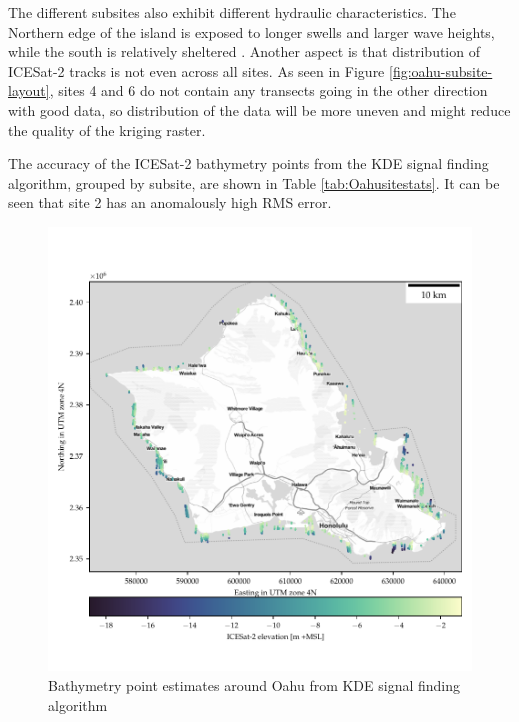 The different subsites also exhibit different hydraulic characteristics. The Northern edge of the island is exposed to longer swells and larger wave heights, while the south is relatively sheltered \parencite{Vitousek2008a}. Another aspect is that distribution of ICESat-2 tracks is not even across all sites. As seen in Figure \ref{fig:oahu-subsite-layout}, sites 4 and 6 do not contain any transects going in the other direction with good data, so distribution of the data will be more uneven and might reduce the quality of the kriging raster.

The accuracy of the ICESat-2 bathymetry points from the KDE signal finding algorithm, grouped by subsite, are shown in Table \ref{tab:Oahusitestats}. It can be seen that site 2 has an anomalously high RMS error.

\begin{figure}[htbp]
    \centering
    \includegraphics{figures/Oahu_all_sites_photon_points.pdf}
    \caption{Bathymetry point estimates around Oahu from KDE signal finding algorithm}
    \label{fig:oahu-photon-map}
\end{figure}


\begin{figure}
    \begin{floatrow}
    \end{floatrow}
\end{figure}

